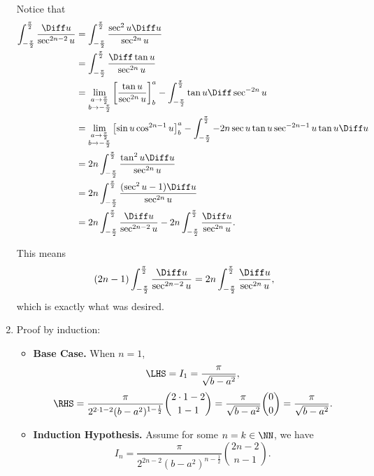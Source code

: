 \begin{enumerate}
    Notice that
    \begin{align*}
        \int_{- \frac{\pi}{2}}^{\frac{\pi}{2}} \frac{\Diff u}{\sec^{2n - 2} u} &= \int_{- \frac{\pi}{2}}^{\frac{\pi}{2}} \frac{\sec^2 u \Diff u}{\sec^{2n} u}\\
        &= \int_{- \frac{\pi}{2}}^{\frac{\pi}{2}} \frac{\Diff \tan u}{\sec^{2n} u}\\
        &= \lim_{\substack{a \to \frac{\pi}{2}\\b \to -\frac{\pi}{2}}}\left[\frac{\tan u}{\sec^{2n}u}\right]^{a}_{b} - \int_{- \frac{\pi}{2}}^{\frac{\pi}{2}} \tan u \Diff \sec^{-2n}u\\
        &= \lim_{\substack{a \to \frac{\pi}{2}\\b \to -\frac{\pi}{2}}}\left[\sin u \cos^{2n - 1} u\right]^{a}_{b} - \int_{- \frac{\pi}{2}}^{\frac{\pi}{2}} -2n \sec u \tan u \sec^{-2n - 1}u \tan u \Diff u\\
        &= 2n \int_{- \frac{\pi}{2}}^{\frac{\pi}{2}} \frac{\tan^2 u \Diff u}{\sec^{2n} u}\\
        &= 2n \int_{- \frac{\pi}{2}}^{\frac{\pi}{2}} \frac{(\sec^2 u - 1) \Diff u}{\sec^{2n} u}\\
        &= 2n \int_{- \frac{\pi}{2}}^{\frac{\pi}{2}} \frac{\Diff u}{\sec^{2n - 2} u} - 2n \int_{- \frac{\pi}{2}}^{\frac{\pi}{2}} \frac{\Diff u}{\sec^{2n} u}.\\
    \end{align*}

    This means
    \[
        (2n - 1) \int_{- \frac{\pi}{2}}^{\frac{\pi}{2}} \frac{\Diff u}{\sec^{2n - 2} u} = 2n \int_{- \frac{\pi}{2}}^{\frac{\pi}{2}} \frac{\Diff u}{\sec^{2n} u},
    \]
    which is exactly what was desired.

    \item Proof by induction:
    \begin{itemize}
        \item \textbf{Base Case.} When \(n = 1\),
        \[
            \LHS = I_1 = \frac{\pi}{\sqrt{b - a^2}},
        \]
        \[
            \RHS = \frac{\pi}{2^{2 \cdot 1 - 2} (b - a^2)^{1 - \frac{1}{2}}} \binom{2 \cdot 1 - 2}{1 - 1}
            = \frac{\pi}{\sqrt{b - a^2}} \binom{0}{0}
            = \frac{\pi}{\sqrt{b - a^2}}.
        \]

        \item \textbf{Induction Hypothesis.} Assume for some \(n = k \in \NN\), we have
        \[
            I_n = \frac{\pi}{2^{2n - 2} (b - a^2)^{n - \frac{1}{2}}} \binom{2n - 2}{n - 1}.
        \]


\end{itemize}
\end{enumerate}
